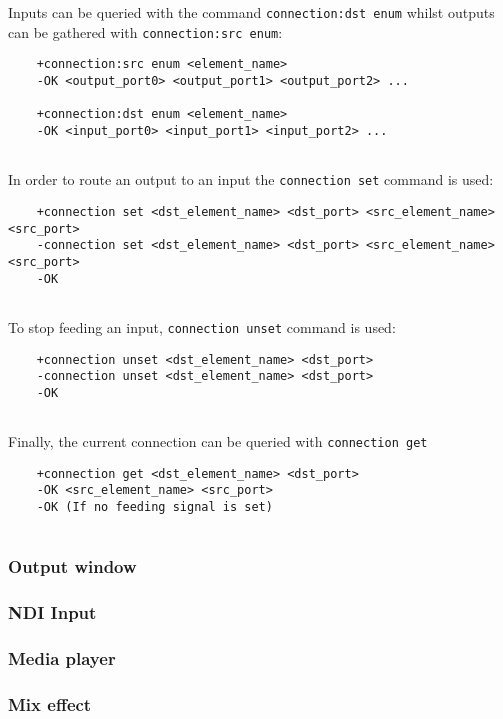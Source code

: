 \documentclass[../main.tex]{subfiles}
\begin{document}
Inputs can be queried with the command \texttt{connection:dst enum} whilst outputs can be gathered with \texttt{connection:src enum}:

\begin{lstlisting}
    +connection:src enum <element_name>
    -OK <output_port0> <output_port1> <output_port2> ...
    
    +connection:dst enum <element_name>
    -OK <input_port0> <input_port1> <input_port2> ...
    
\end{lstlisting}

In order to route an output to an input the \texttt{connection set} command is used:

\begin{lstlisting}
    +connection set <dst_element_name> <dst_port> <src_element_name> <src_port>
    -connection set <dst_element_name> <dst_port> <src_element_name> <src_port>
    -OK
    
\end{lstlisting}


To stop feeding an input, \texttt{connection unset} command is used:

\begin{lstlisting}
    +connection unset <dst_element_name> <dst_port>
    -connection unset <dst_element_name> <dst_port>
    -OK
    
\end{lstlisting}

Finally, the current connection can be queried with \texttt{connection get}

\begin{lstlisting}
    +connection get <dst_element_name> <dst_port>
    -OK <src_element_name> <src_port>
    -OK (If no feeding signal is set)
    
\end{lstlisting}



\subsubsection{Output window}



\subsubsection{NDI Input}



\subsubsection{Media player}



\subsubsection{Mix effect}
\end{document}

